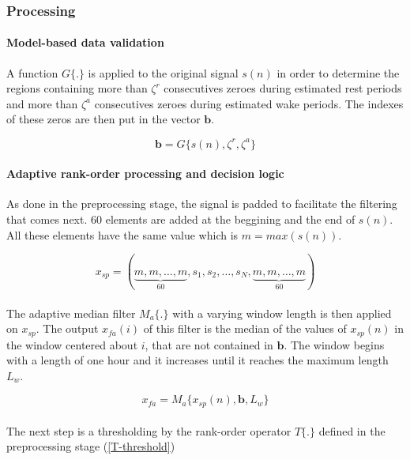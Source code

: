 \documentclass[a4paper,10pt]{article}
\begin{document}
\subsubsection{Processing}

\paragraph{Model-based data validation}
A function $G\{.\}$ is applied to the original signal $s(n)$ in order to determine the regions containing more than $\zeta^r$ consecutives zeroes during estimated rest periods and more than $\zeta^a$ consecutives zeroes during estimated wake periods. The indexes of these zeros are then put in the vector $\mathbf{b}$.

\begin{equation}
\mathbf{b} = G\{s(n), \zeta^r, \zeta^a\}
\end{equation}

\paragraph{Adaptive rank-order processing and decision logic}
As done in the preprocessing stage, the signal is padded to facilitate the filtering that comes next. 60 elements are added at the beggining and the end of $s(n)$. All these elements have the same value which is $m = max(s(n))$.

\begin{equation}
x_{sp} = (\underbrace{m, m, \ldots, m}_{60}, s_1, s_2, \ldots, s_N, \underbrace{m, m, \ldots, m}_{60})
\end{equation}

\paragraph{}
The adaptive median filter $M_a\{.\}$ with a varying window length is then applied on $x_{sp}$. The output $x_{fa}(i)$ of this filter is the median of the values of $x_{sp}(n)$ in the window centered about $i$, that are not contained in $\mathbf{b}$.
The window begins with a length of one hour and it increases until it reaches the maximum length $L_w$.

\begin{equation}
x_{fa} = M_a\{x_{sp}(n), \mathbf{b}, L_w\}
\end{equation}

\paragraph{}
The next step is a thresholding by the rank-order operator $T\{.\}$ defined in the preprocessing stage (\ref{T-threshold})
\end{document}
